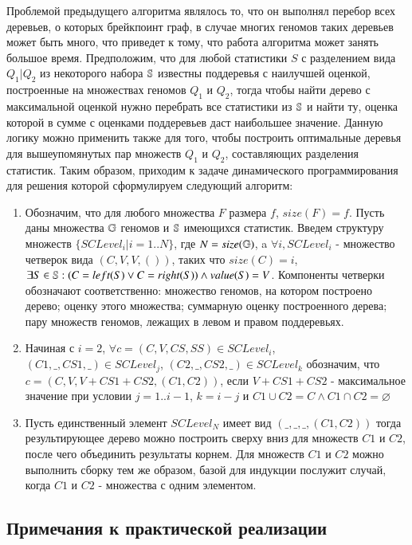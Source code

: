 Проблемой предыдущего алгоритма являлось то, что он выполнял перебор всех деревьев, о которых  брейкпоинт граф,
в случае многих геномов таких деревьев может быть много, что приведет к тому, что работа алгоритма может занять большое время.
Предположим, что для любой статистики $S$ с разделением вида $Q_1|Q_2$ из некоторого набора $\mathbb{S}$ известны поддеревья с наилучшей оценкой,
построенные на множествах геномов $Q_1$ и $Q_2$, тогда чтобы найти дерево с максимальной оценкой нужно перебрать все статистики из $\mathbb{S}$ и найти ту,
оценка которой в сумме с оценками поддеревьев даст наибольшее значение.
Данную логику можно применить также для того, чтобы построить оптимальные деревья для вышеупомянутых пар множеств $Q_1$ и $Q_2$,
составляющих разделения статистик.
Таким образом, приходим к задаче динамического программирования для решения которой сформулируем следующий алгоритм:
\begin{enumerate}
  \item Обозначим, что для любого множества $F$ размера $f$, $size(F) = f$.
    Пусть даны множества $\mathbb{G}$ геномов и $\mathbb{S}$ имеющихся статистик.
    Введем структуру множеств $\{ SCLevel_i | i = 1..N \}$, где $N = size(\mathbb{G})$,
    a $\forall i, SCLevel_i$ - множество четверок вида $(C, V, V, ())$, таких что $size(C) = i$,
    $\exists S \in \mathbb{S}: (C = left(S) \lor C = right(S)) \land value(S) = V$.
    Компоненты четверки обозначают соответственно: множество геномов, на котором построено дерево;
    оценку этого множества; суммарную оценку построенного дерева; пару множеств геномов, лежащих в левом и правом поддеревьях.
  \item Начиная с $i = 2$,
    $\forall c = (C, V, CS, SS) \in SCLevel_i$,
    $(C1, \_, CS1, \_) \in SCLevel_j$,
    $(C2, \_, CS2, \_) \in SCLevel_k$ обозначим, что $c = (C, V, V + CS1 + CS2, (C1, C2))$,
    если $V + CS1 + CS2$ - максимальное значение при условии  $j = 1..i-1$, $k = i - j$ и $C1 \cup C2 = C \land C1 \cap C2 = \varnothing$
  \item Пусть единственный элемент $SCLevel_N$ имеет вид $(\_, \_, \_, (C1, C2))$ тогда результирующее дерево можно построить сверху
    вниз для множеств $C1$ и $C2$, после чего объединить результаты корнем.
    Для множеств $C1$ и $C2$ можно выполнить сборку тем же образом, базой для индукции послужит случай,
    когда $C1$ и $C2$ - множества с одним элементом.
\end{enumerate}

\subsection{Примечания к практической реализации}

